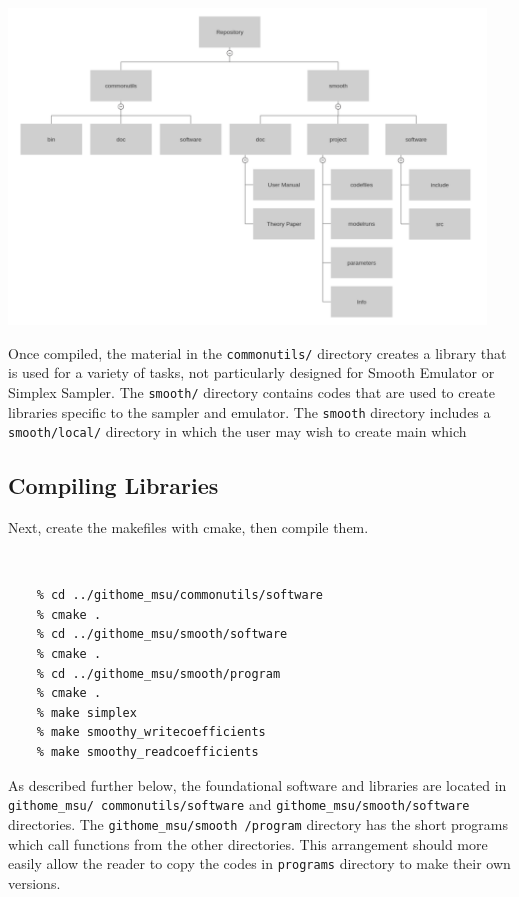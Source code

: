 \documentclass[12pt]{article}
\numberwithin{equation}{section}
\numberwithin{figure}{section}
\begin{document}
\centerline{\includegraphics[width = 0.95\textwidth]{Structure_Tree.png}}

Once compiled, the material in the {\tt commonutils/} directory creates a library that is used for a variety of tasks, not particularly designed for Smooth Emulator or Simplex Sampler. The {\tt smooth/} directory contains codes that are used to create libraries specific to the sampler and emulator. The {\tt smooth} directory includes a {\tt smooth/local/} directory in which the user may wish to create main which 

\subsection{Compiling Libraries}

Next, create the makefiles with cmake, then compile them.\\
\vspace{-20pt}
{\tt 
\begin{verbatim}
    % cd ../githome_msu/commonutils/software
    % cmake .
    % cd ../githome_msu/smooth/software
    % cmake .
    % cd ../githome_msu/smooth/program
    % cmake .
    % make simplex
    % make smoothy_writecoefficients
    % make smoothy_readcoefficients
\end{verbatim}
}
As described further below, the foundational software and libraries are located in {\tt githome\_msu/ commonutils/software} and {\tt githome\_msu/smooth/software} directories. The {\tt githome\_msu/smooth /program} directory has the short programs which call functions from the other directories. This arrangement should more easily allow the reader to copy the codes in {\tt programs} directory to make their own versions.
\end{document}
